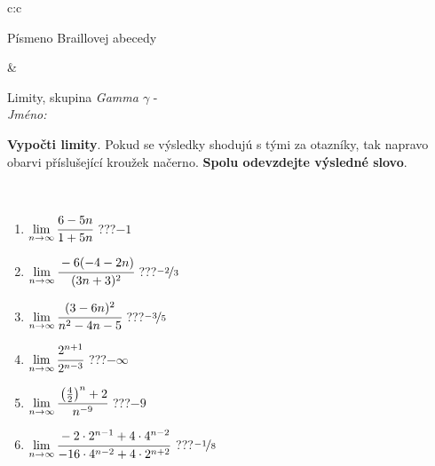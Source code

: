\documentclass[10pt]{report}
\begin{document}
\begin{tabular}{c:c}
\begin{minipage}[c][104.5mm][t]{0.5\linewidth}
\begin{center}
\begin{minipage}{0.20\linewidth}
\begin{center}
{\small Písmeno Braillovej abecedy}
\end{center}
\end{minipage}
\end{center}
\end{minipage}
&
\begin{minipage}[c][104.5mm][t]{0.5\linewidth}
\begin{center}
\vspace{7mm}
{\huge Limity, skupina \textit{Gamma $\gamma$} -}\\[5mm]
\textit{Jméno:}\phantom{xxxxxxxxxxxxxxxxxxxxxxxxxxxxxxxxxxxxxxxxxxxxxxxxxxxxxxxxxxxxxxxxx}\\[5mm]
\begin{minipage}{0.95\linewidth}
\begin{center}
\textbf{Vypočti limity}. Pokud se výsledky shodujú s tými za otazníky, tak napravo\\obarvi příslušející kroužek načerno. \textbf{Spolu odevzdejte výsledné slovo}.
\end{center}
\end{minipage}
\\[1mm]
\begin{minipage}{0.79\linewidth}
\begin{center}
\begin{varwidth}{\linewidth}
\begin{enumerate}
\normalsize
\item $\lim\limits_{n\to\infty}\cfrac{6-5n}{1+5n}$\quad \dotfill\; ???\;\dotfill \quad $-1$
\item $\lim\limits_{n\to\infty}\cfrac{-6(-4-2n)}{(3n+3)^2}$\quad \dotfill\; ???\;\dotfill \quad $\nicefrac{-2}{3}$
\item $\lim\limits_{n\to\infty}\cfrac{(3-6n)^2}{n^2-4n-5}$\quad \dotfill\; ???\;\dotfill \quad $\nicefrac{-3}{5}$
\item $\lim\limits_{n\to\infty}\cfrac{2^{n+1}}{2^{n-3}}$\quad \dotfill\; ???\;\dotfill \quad $-\infty$
\item $\lim\limits_{n\to\infty}\cfrac{\left(\frac{4}{2}\right)^n +2}{n^{-9}}$\quad \dotfill\; ???\;\dotfill \quad $-9$
\item $\lim\limits_{n\to\infty}\cfrac{-2\cdot 2^{n-1}+4\cdot 4^{n-2}}{-16\cdot 4^{n-2}+4\cdot 2^{n+2}}$\quad \dotfill\; ???\;\dotfill \quad $\nicefrac{-1}{8}$
\end{enumerate}
\end{varwidth}
\end{center}
\end{minipage}

\end{center}
\end{minipage}
\end{tabular}
\end{document}
